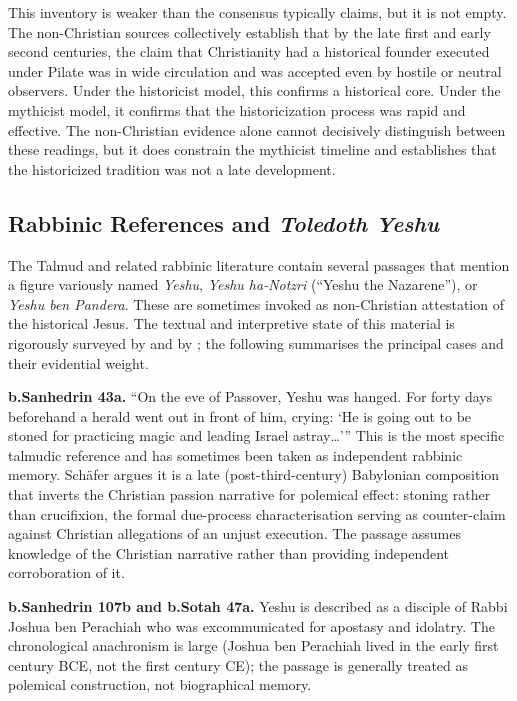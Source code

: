 \documentclass[12pt,oneside]{article}
\newcommand{\grk}[1]{\textit{#1}}   %
\begin{document}
This inventory is weaker than the consensus typically claims, but it is
not empty.  The non-Christian sources collectively establish that by the
late first and early second centuries, the claim that Christianity had
a historical founder executed under Pilate was in wide circulation and
was accepted even by hostile or neutral observers.  Under the historicist
model, this confirms a historical core.  Under the mythicist model, it
confirms that the historicization process was rapid and effective.  The
non-Christian evidence alone cannot decisively distinguish between these
readings, but it does constrain the mythicist timeline and establishes
that the historicized tradition was not a late development.

\subsection{Rabbinic References and \textit{Toledoth Yeshu}}
\label{sec:external:rabbinic}

The Talmud and related rabbinic literature contain several passages
that mention a figure variously named \grk{Yeshu}, \grk{Yeshu
ha-Notzri} (\enquote{Yeshu the Nazarene}), or \grk{Yeshu ben Pandera}.
These are sometimes invoked as non-Christian attestation of the
historical Jesus.  The textual and interpretive state of this material
is rigorously surveyed by \citet{SchaferP2007} and by
\citet{MeersonSchafer2014}; the following summarises the principal
cases and their evidential weight.

\textbf{b.Sanhedrin 43a.}  \enquote{On the eve of Passover, Yeshu
was hanged.  For forty days beforehand a herald went out in front
of him, crying: `He is going out to be stoned for practicing magic
and leading Israel astray\ldots'}  This is the most specific
talmudic reference and has sometimes been taken as independent
rabbinic memory.  Schäfer argues it is a late (post-third-century)
Babylonian composition that inverts the Christian passion narrative
for polemical effect: stoning rather than crucifixion, the formal
due-process characterisation serving as counter-claim against
Christian allegations of an unjust execution.  The passage assumes
knowledge of the Christian narrative rather than providing
independent corroboration of it.

\textbf{b.Sanhedrin 107b and b.Sotah 47a.}  Yeshu is described as a
disciple of Rabbi Joshua ben Perachiah who was excommunicated for
apostasy and idolatry.  The chronological anachronism is large
(Joshua ben Perachiah lived in the early first century BCE, not
the first century CE); the passage is generally treated as
polemical construction, not biographical memory.
\end{document}
